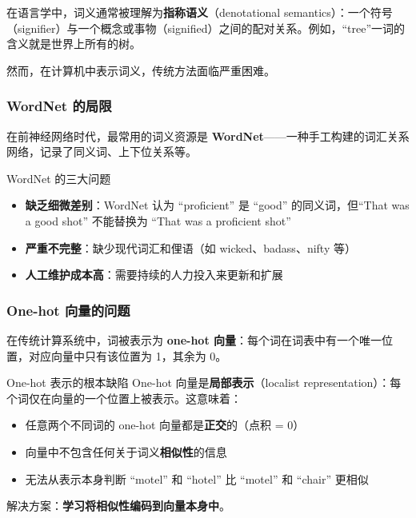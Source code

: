 \documentclass[a4paper]{article}
\begin{document}
在语言学中，词义通常被理解为\textbf{指称语义}（denotational semantics）：一个符号（signifier）与一个概念或事物（signified）之间的配对关系。例如，``tree''一词的含义就是世界上所有的树。





然而，在计算机中表示词义，传统方法面临严重困难。

\subsubsection{WordNet 的局限}

在前神经网络时代，最常用的词义资源是 \textbf{WordNet}——一种手工构建的词汇关系网络，记录了同义词、上下位关系等。





\begin{warningbox}{WordNet 的三大问题}
\begin{itemize}
    \item \textbf{缺乏细微差别}：WordNet 认为 ``proficient'' 是 ``good'' 的同义词，但``That was a good shot'' 不能替换为 ``That was a proficient shot''
    \item \textbf{严重不完整}：缺少现代词汇和俚语（如 wicked、badass、nifty 等）
    \item \textbf{人工维护成本高}：需要持续的人力投入来更新和扩展
\end{itemize}
\end{warningbox}

\subsubsection{One-hot 向量的问题}

在传统计算系统中，词被表示为 \textbf{one-hot 向量}：每个词在词表中有一个唯一位置，对应向量中只有该位置为 1，其余为 0。





\begin{importantbox}{One-hot 表示的根本缺陷}
One-hot 向量是\textbf{局部表示}（localist representation）：每个词仅在向量的一个位置上被表示。这意味着：
\begin{itemize}
    \item 任意两个不同词的 one-hot 向量都是\textbf{正交}的（点积 = 0）
    \item 向量中不包含任何关于词义\textbf{相似性}的信息
    \item 无法从表示本身判断 ``motel'' 和 ``hotel'' 比 ``motel'' 和 ``chair'' 更相似
\end{itemize}
解决方案：\textbf{学习将相似性编码到向量本身中}。
\end{importantbox}
\end{document}
